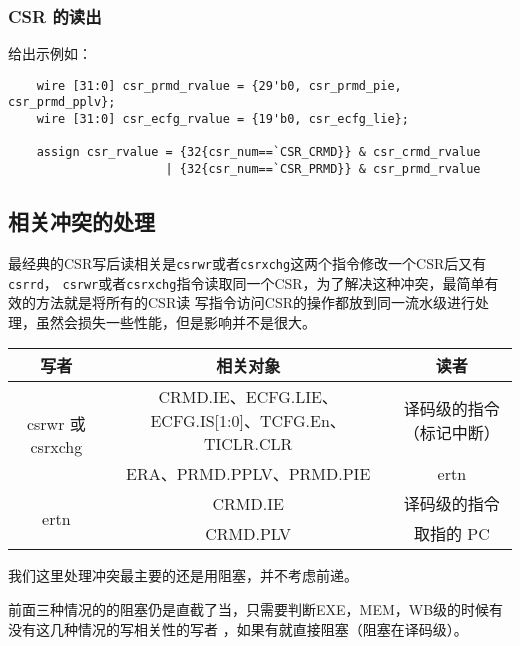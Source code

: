 \subsubsection{CSR 的读出}

给出示例如：

\begin{lstlisting}
    wire [31:0] csr_prmd_rvalue = {29'b0, csr_prmd_pie, csr_prmd_pplv};
    wire [31:0] csr_ecfg_rvalue = {19'b0, csr_ecfg_lie};

    assign csr_rvalue = {32{csr_num==`CSR_CRMD}} & csr_crmd_rvalue
                      | {32{csr_num==`CSR_PRMD}} & csr_prmd_rvalue
\end{lstlisting}


\subsection{相关冲突的处理}

最经典的CSR写后读相关是\texttt{csrwr}或者\texttt{csrxchg}这两个指令修改一个CSR后又有\texttt{csrrd}，
\texttt{csrwr}或者\texttt{csrxchg}指令读取同一个CSR，为了解决这种冲突，最简单有效的方法就是将所有的CSR读
写指令访问CSR的操作都放到同一流水级进行处理，虽然会损失一些性能，但是影响并不是很大。

\begin{table}[H]
    \centering
    \begin{adjustbox}{width=\linewidth} 
    \small
    \begin{tabularx}{\linewidth}{ccc}
        \toprule
        {\bfseries 写者} & {\bfseries 相关对象} & {\bfseries 读者} \\ 
        \midrule
        \multirow{2}{*}{csrwr 或 csrxchg} & CRMD.IE、ECFG.LIE、ECFG.IS[1:0]、TCFG.En、TICLR.CLR& 译码级的指令（标记中断）\\
         & ERA、PRMD.PPLV、PRMD.PIE& ertn\\
        \multirow{2}{*}{ertn} & CRMD.IE&译码级的指令 \\
         &CRMD.PLV &取指的 PC \\
        \bottomrule
    \end{tabularx}
\end{adjustbox}
\end{table}

我们这里处理冲突最主要的还是用阻塞，并不考虑前递。

前面三种情况的的阻塞仍是直截了当，只需要判断EXE，MEM，WB级的时候有没有这几种情况的写相关性的写者
，如果有就直接阻塞（阻塞在译码级）。

